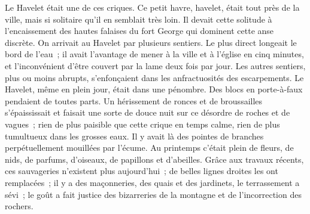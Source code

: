 \documentclass[french,twoside]{book} %
\begin{document}
Le Havelet était une de ces criques. Ce petit havre, havelet, était tout près de la ville, mais si solitaire qu’il en semblait très loin. Il devait cette solitude à l’encaissement des hautes falaises du fort George qui dominent cette anse discrète. On arrivait au Havelet par plusieurs sentiers. Le plus direct longeait le bord de l’eau ; il avait l’avantage de mener à la ville et à l’église en cinq minutes, et l’inconvénient d’être couvert par la lame deux fois par jour. Les autres sentiers, plus ou moins abrupts, s’enfonçaient dans les anfractuosités des escarpements. Le Havelet, même en plein jour, était dans une pénombre. Des blocs en porte-à-faux pendaient de toutes parts. Un hérissement de ronces et de broussailles s’épaississait et faisait une sorte de douce nuit sur ce désordre de roches et de vagues ; rien de plus paisible que cette crique en temps calme, rien de plus tumultueux dans les grosses eaux. Il y avait là des pointes de branches perpétuellement mouillées par l’écume. Au printemps c’était plein de fleurs, de nids, de parfums, d’oiseaux, de papillons et d’abeilles. Grâce aux travaux récents, ces sauvageries  n’existent plus aujourd’hui ; de belles lignes droites les ont remplacées ; il y a des maçonneries, des quais et des jardinets, le terrassement a sévi ; le goût a fait justice des bizarreries de la montagne et de l’incorrection des rochers.
\end{document}
